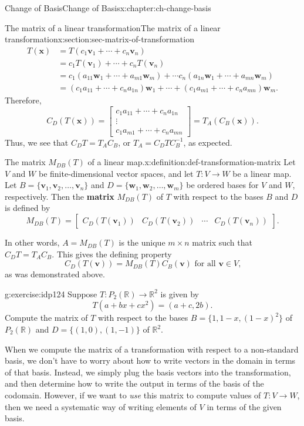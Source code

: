 \documentclass[oneside,10pt,]{book}
\newcommand{\terminology}[1]{\textbf{#1}}
\numberwithin{equation}{section}
\newcommand{\bbm}{\begin{bmatrix}}
\newcommand{\ebm}{\end{bmatrix}}
\newcommand{\R}{\mathbb{R}}
\newcommand{\vv}{\mathbf{v}}
\newcommand{\ww}{\mathbf{w}}
\newcommand{\xx}{\mathbf{x}}
\newcommand{\basis}[2]{\{\mathbf{#1}_1,\mathbf{#1}_2,\ldots,\mathbf{#1}_{#2}\}}
\newcommand{\amp}{&}
\begin{document}
\begin{chapterptx}{Change of Basis}{}{Change of Basis}{}{}{x:chapter:ch-change-basis}
\begin{sectionptx}{The matrix of a linear transformation}{}{The matrix of a linear transformation}{}{}{x:section:sec-matrix-of-transformation}
\begin{align*}
T(\xx) \amp = T(c_1\vv_1+\cdots + c_n\vv_n) \\
\amp = c_1T(\vv_1)+\cdots + c_nT(\vv_n)\\
\amp = c_1(a_{11}\ww_1+\cdots + a_{m1}\ww_m)+\cdots c_n(a_{1n}\ww_1+\cdots + a_{mn}\ww_m)\\
\amp = (c_1a_{11}+\cdots + c_na_{1n})\ww_1 + \cdots + (c_1a_{m1}+\cdots + c_na_{mn})\ww_m\text{.}
\end{align*}
Therefore,%
\begin{equation*}
C_D(T(\xx)) = \bbm c_1a_{11}+\cdots + c_na_{1n}\\ \vdots \\ c_1a_{m1}+\cdots + c_na_{mn}\ebm = T_A(C_B(\xx))\text{.}
\end{equation*}
Thus, we see that \(C_DT = T_AC_B\), or \(T_A = C_DTC_B^{-1}\), as expected.%
\begin{definition}{The matrix \(M_{DB}(T)\) of a linear map.}{x:definition:def-transformation-matrix}%
Let \(V\) and \(W\) be finite-dimensional vector spaces, and let \(T:V\to W\) be a linear map. Let \(B=\basis{v}{n}\) and \(D=\basis{w}{m}\) be ordered bases for \(V\) and \(W\), respectively. Then the \terminology{matrix} \(M_{DB}(T)\) of \(T\) with respect to the bases \(B\) and \(D\) is defined by%
\begin{equation*}
M_{DB}(T) = \bbm C_D(T(\vv_1)) \amp C_D(T(\vv_2)) \amp \cdots \amp C_D(T(\vv_n))\ebm\text{.}
\end{equation*}
%
\end{definition}
In other words, \(A=M_{DB}(T)\) is the unique \(m\times n\) matrix such that \(C_DT = T_AC_B\). This gives the defining property%
\begin{equation*}
C_D(T(\vv)) = M_{DB}(T)C_B(\vv)  \text{ for all } \vv\in V\text{,}
\end{equation*}
as was demonstrated above.%
\begin{inlineexercise}{}{g:exercise:idp124}%
Suppose \(T:P_2(\R)\to \R^2\) is given by%
\begin{equation*}
T(a+bx+cx^2) = (a+c,2b)\text{.}
\end{equation*}
Compute the matrix of \(T\) with respect to the bases \(B = \{1,1-x,(1-x)^2\}\) of \(P_2(\R)\) and \(D = \{(1,0),(1,-1)\}\) of \(\R^2\).%
\end{inlineexercise}%
When we compute the matrix of a transformation with respect to a non-standard basis, we don't have to worry about how to write vectors in the domain in terms of that basis. Instead, we simply plug the basis vectors into the transformation, and then determine how to write the output in terms of the basis of the codomain. However, if we want to \emph{use} this matrix to compute values of \(T:V\to W\), then we need a systematic way of writing elements of \(V\) in terms of the given basis.%

\end{sectionptx}
\end{chapterptx}
\end{document}
